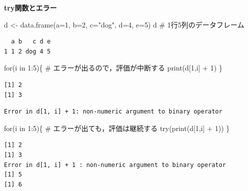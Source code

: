 \documentclass[
  letterpaper,
  DIV=11,
  numbers=noendperiod]{scrreprt}
\newenvironment{Shaded}{\begin{snugshade}}{\end{snugshade}}
\newcommand{\AttributeTok}[1]{\textcolor[rgb]{0.40,0.45,0.13}{#1}}
\newcommand{\CommentTok}[1]{\textcolor[rgb]{0.37,0.37,0.37}{#1}}
\newcommand{\ControlFlowTok}[1]{\textcolor[rgb]{0.00,0.23,0.31}{#1}}
\newcommand{\DecValTok}[1]{\textcolor[rgb]{0.68,0.00,0.00}{#1}}
\newcommand{\FunctionTok}[1]{\textcolor[rgb]{0.28,0.35,0.67}{#1}}
\newcommand{\NormalTok}[1]{\textcolor[rgb]{0.00,0.23,0.31}{#1}}
\newcommand{\OtherTok}[1]{\textcolor[rgb]{0.00,0.23,0.31}{#1}}
\newcommand{\SpecialCharTok}[1]{\textcolor[rgb]{0.37,0.37,0.37}{#1}}
\newcommand{\StringTok}[1]{\textcolor[rgb]{0.13,0.47,0.30}{#1}}
\begin{document}
\textbf{try関数とエラー}

\begin{Shaded}
\begin{Highlighting}[]
\NormalTok{d }\OtherTok{\textless{}{-}} \FunctionTok{data.frame}\NormalTok{(}\AttributeTok{a=}\DecValTok{1}\NormalTok{, }\AttributeTok{b=}\DecValTok{2}\NormalTok{, }\AttributeTok{c=}\StringTok{"dog"}\NormalTok{, }\AttributeTok{d=}\DecValTok{4}\NormalTok{, }\AttributeTok{e=}\DecValTok{5}\NormalTok{)}
\NormalTok{d }\CommentTok{\# 1行5列のデータフレーム}
\end{Highlighting}
\end{Shaded}

\begin{verbatim}
  a b   c d e
1 1 2 dog 4 5
\end{verbatim}

\begin{Shaded}
\begin{Highlighting}[]
\ControlFlowTok{for}\NormalTok{(i }\ControlFlowTok{in} \DecValTok{1}\SpecialCharTok{:}\DecValTok{5}\NormalTok{)\{ }\CommentTok{\# エラーが出るので，評価が中断する}
  \FunctionTok{print}\NormalTok{(d[}\DecValTok{1}\NormalTok{,i] }\SpecialCharTok{+} \DecValTok{1}\NormalTok{)}
\NormalTok{\}}
\end{Highlighting}
\end{Shaded}

\begin{verbatim}
[1] 2
[1] 3
\end{verbatim}

\begin{verbatim}
Error in d[1, i] + 1: non-numeric argument to binary operator
\end{verbatim}

\begin{Shaded}
\begin{Highlighting}[]
\ControlFlowTok{for}\NormalTok{(i }\ControlFlowTok{in} \DecValTok{1}\SpecialCharTok{:}\DecValTok{5}\NormalTok{)\{ }\CommentTok{\# エラーが出ても，評価は継続する}
  \FunctionTok{try}\NormalTok{(}\FunctionTok{print}\NormalTok{(d[}\DecValTok{1}\NormalTok{,i] }\SpecialCharTok{+} \DecValTok{1}\NormalTok{))}
\NormalTok{\}}
\end{Highlighting}
\end{Shaded}

\begin{verbatim}
[1] 2
[1] 3
Error in d[1, i] + 1 : non-numeric argument to binary operator
[1] 5
[1] 6
\end{verbatim}
\end{document}
